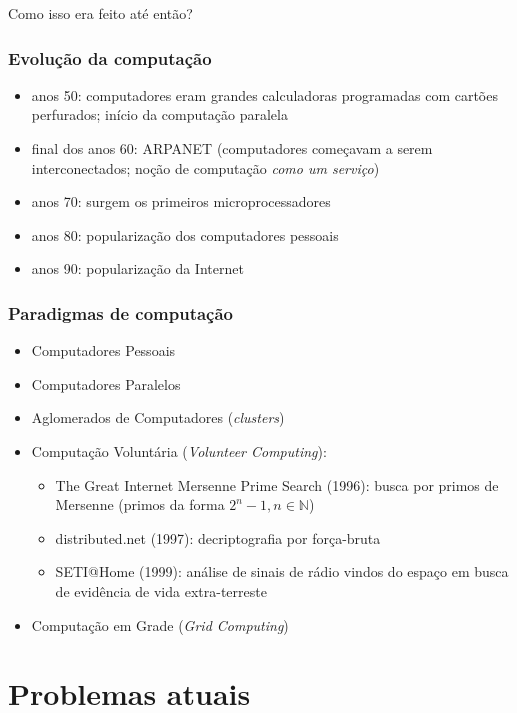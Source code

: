 \documentclass[Ligatures=TeX,table,brazil,svgnames,usetotalslideindicator,comp
ress,10pt]{beamer}
\begin{document}
\begin{frame}
  \Huge Como isso era feito até então?
\end{frame}

\begin{frame}
  \frametitle{Evolução da computação}
    \begin{itemize}[<+->]
    \item anos 50: computadores eram grandes calculadoras programadas
      com cartões perfurados; início da computação paralela
    \item final dos anos 60: ARPANET (computadores começavam a serem
      interconectados; noção de computação \emph{como um serviço})
    \item anos 70: surgem os primeiros microprocessadores
    \item anos 80: popularização dos computadores pessoais
    \item anos 90: popularização da Internet
    \end{itemize}
\end{frame}

\begin{frame}
  \frametitle{Paradigmas de computação}

  \begin{itemize}[<+->]
  \item Computadores Pessoais
  \item Computadores Paralelos
  \item Aglomerados de Computadores (\textit{clusters})
  \item Computação Voluntária (\textit{Volunteer Computing}):
    \begin{itemize}
    \item The Great Internet Mersenne Prime Search (1996): busca por
      primos de Mersenne (primos da forma $2^n-1, n \in \mathbb{N}$)
    \item distributed.net (1997): decriptografia por força-bruta
    \item SETI@Home (1999): análise de sinais de rádio vindos do
      espaço em busca de evidência de vida extra-terreste
    \end{itemize}
  \item Computação em Grade (\textit{Grid Computing})
  \end{itemize}
\end{frame}

\section{Problemas atuais}
\end{document}
